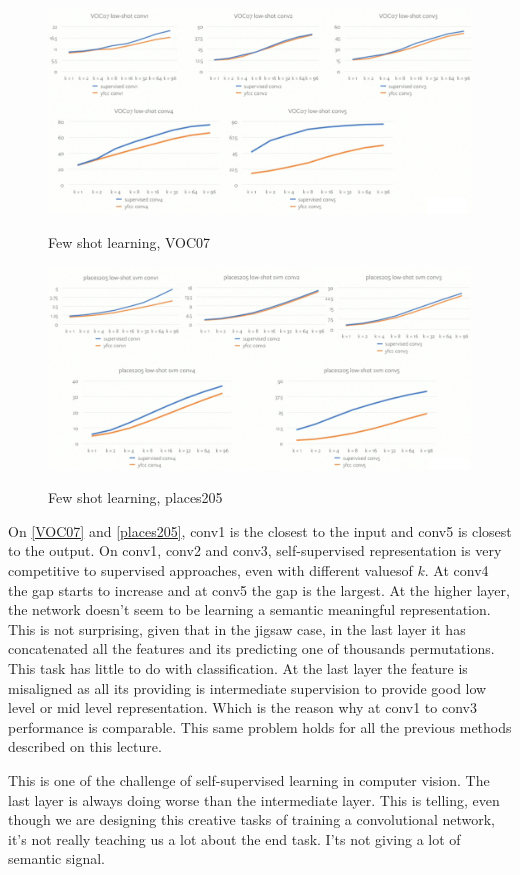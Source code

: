 \begin{figure}[htb!]
\centering
\includegraphics[width=0.8\linewidth]{lectures/14-b/graphics/VOC07.png}
\label{fig:VOC07}
\caption{Few shot learning, VOC07}
\end{figure}
\begin{figure}[htb!]
\centering
\includegraphics[width=0.8\linewidth]{lectures/14-b/graphics/places205.png}
\label{fig:places205}
\caption{Few shot learning, places205}
\end{figure}

On \ref{VOC07} and \ref{places205}, conv1 is the closest to the input and conv5 is closest to the output. On conv1, conv2 and conv3, self-supervised representation is very competitive to supervised approaches, even with different valuesof $k$. At conv4 the gap starts to increase and at conv5 the gap is the largest. At the higher layer, the network doesn't seem to be learning a semantic meaningful representation. This is not surprising, given that in the jigsaw case, in the last layer it has concatenated all the features and its predicting one of thousands permutations. This task has little to do with classification. At the last layer the feature is misaligned as all its providing is intermediate supervision to provide good low level or mid level representation. Which is the reason why at conv1 to conv3 performance is comparable. This same problem holds for all the previous methods described on this lecture. 

This is one of the challenge of self-supervised learning in computer vision. The last layer is always doing worse than the intermediate layer. This is telling, even though we are designing this creative tasks of training a convolutional network, it’s not really teaching us a lot about the end task. I’ts not giving a lot of semantic signal.

